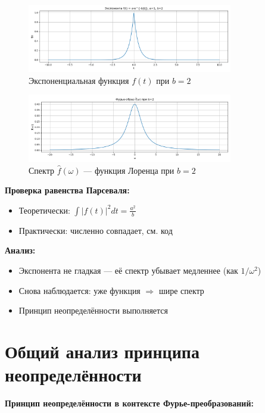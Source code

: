 \begin{figure}[H]
    \centering
    \includegraphics[width=0.8\textwidth]{exp_function_b2.png}
    \caption{Экспоненциальная функция $f(t)$ при $b = 2$}
\end{figure}

\begin{figure}[H]
    \centering
    \includegraphics[width=0.8\textwidth]{exp_spectrum_b2.png}
    \caption{Спектр $\hat{f}(\omega)$ — функция Лоренца при $b = 2$}
\end{figure}

\textbf{Проверка равенства Парсеваля:}

\begin{itemize}
    \item Теоретически: $\displaystyle \int |f(t)|^2 dt = \frac{a^2}{b}$
    \item Практически: численно совпадает, см. код
\end{itemize}

\textbf{Анализ:}

\begin{itemize}
    \item Экспонента не гладкая — её спектр убывает медленнее (как $1/\omega^2$)
    \item Снова наблюдается: уже функция $\Rightarrow$ шире спектр
    \item Принцип неопределённости выполняется
\end{itemize}

\section*{Общий анализ принципа неопределённости}

\textbf{Принцип неопределённости в контексте Фурье-преобразований:}

